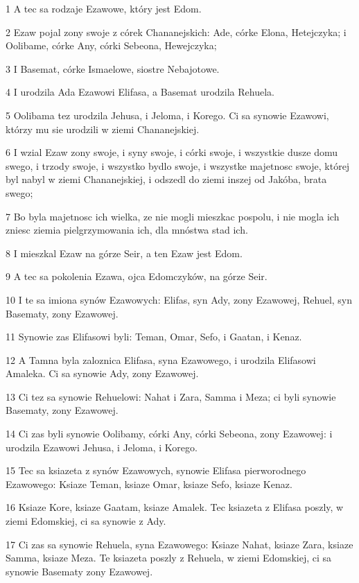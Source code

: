 \par 1 A tec sa rodzaje Ezawowe, który jest Edom.
\par 2 Ezaw pojal zony swoje z córek Chananejskich: Ade, córke Elona, Hetejczyka; i Oolibame, córke Any, córki Sebeona, Hewejczyka;
\par 3 I Basemat, córke Ismaelowe, siostre Nebajotowe.
\par 4 I urodzila Ada Ezawowi Elifasa, a Basemat urodzila Rehuela.
\par 5 Oolibama tez urodzila Jehusa, i Jeloma, i Korego. Ci sa synowie Ezawowi, którzy mu sie urodzili w ziemi Chananejskiej.
\par 6 I wzial Ezaw zony swoje, i syny swoje, i córki swoje, i wszystkie dusze domu swego, i trzody swoje, i wszystko bydlo swoje, i wszystke majetnosc swoje, której byl nabyl w ziemi Chananejskiej, i odszedl do ziemi inszej od Jakóba, brata swego;
\par 7 Bo byla majetnosc ich wielka, ze nie mogli mieszkac pospolu, i nie mogla ich zniesc ziemia pielgrzymowania ich, dla mnóstwa stad ich.
\par 8 I mieszkal Ezaw na górze Seir, a ten Ezaw jest Edom.
\par 9 A tec sa pokolenia Ezawa, ojca Edomczyków, na górze Seir.
\par 10 I te sa imiona synów Ezawowych: Elifas, syn Ady, zony Ezawowej, Rehuel, syn Basematy, zony Ezawowej.
\par 11 Synowie zas Elifasowi byli: Teman, Omar, Sefo, i Gaatan, i Kenaz.
\par 12 A Tamna byla zaloznica Elifasa, syna Ezawowego, i urodzila Elifasowi Amaleka. Ci sa synowie Ady, zony Ezawowej.
\par 13 Ci tez sa synowie Rehuelowi: Nahat i Zara, Samma i Meza; ci byli synowie Basematy, zony Ezawowej.
\par 14 Ci zas byli synowie Oolibamy, córki Any, córki Sebeona, zony Ezawowej: i urodzila Ezawowi Jehusa, i Jeloma, i Korego.
\par 15 Tec sa ksiazeta z synów Ezawowych, synowie Elifasa pierworodnego Ezawowego: Ksiaze Teman, ksiaze Omar, ksiaze Sefo, ksiaze Kenaz.
\par 16 Ksiaze Kore, ksiaze Gaatam, ksiaze Amalek. Tec ksiazeta z Elifasa poszly, w ziemi Edomskiej, ci sa synowie z Ady.
\par 17 Ci zas sa synowie Rehuela, syna Ezawowego: Ksiaze Nahat, ksiaze Zara, ksiaze Samma, ksiaze Meza. Te ksiazeta poszly z Rehuela, w ziemi Edomskiej, ci sa synowie Basematy zony Ezawowej.
